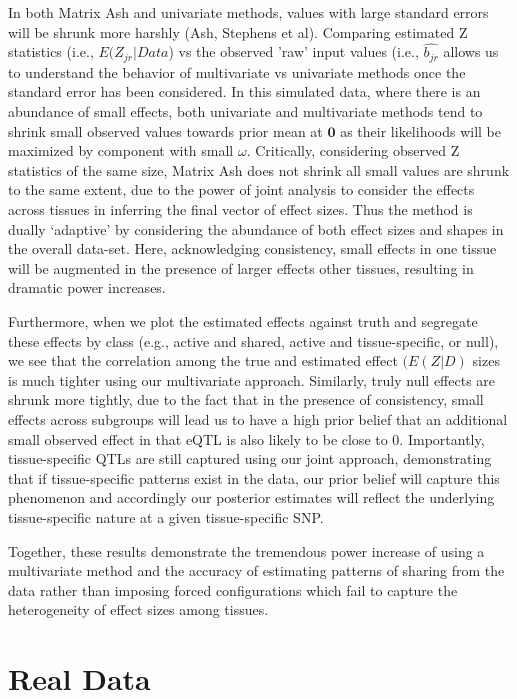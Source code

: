 {

In both Matrix Ash and univariate methods, values with large standard errors will be shrunk more harshly (Ash, Stephens et al). Comparing estimated Z statistics (i.e., $E(Z_{jr}|Data$) vs the observed 'raw' input values (i.e., $\hat{b_{jr}}$ allows us to understand the behavior of multivariate vs univariate methods once the standard error has been considered. In this simulated data, where there is an abundance of small effects, both univariate and multivariate methods tend to shrink small observed values towards prior mean at $\bm{0}$ as their likelihoods will be maximized by component with small $\omega$. Critically, considering observed Z statistics of the same size, Matrix Ash does not shrink all small values are shrunk to the same extent, due to the power of joint analysis to consider the effects across tissues in inferring the final vector of effect sizes. Thus the method is dually `adaptive' by considering the abundance of both effect sizes and shapes in the overall data-set.  Here, acknowledging consistency, small effects in one tissue will be augmented in the presence of larger effects  other tissues, resulting in dramatic power increases. 

Furthermore, when we plot the estimated effects against truth and segregate these effects by class (e.g., active and shared, active and tissue-specific, or null), we see that the correlation among the true and estimated effect $(E(Z|D)$ sizes is much tighter using our multivariate approach. Similarly, truly null effects are shrunk more tightly, due to the fact that in the presence of consistency, small effects across subgroups will lead us to have a high prior belief that an additional small observed effect in that eQTL is also likely to be close to 0. Importantly, tissue-specific QTLs are still captured using our joint approach, demonstrating that if tissue-specific patterns exist in the data, our prior belief will capture this phenomenon and accordingly our posterior estimates will reflect the underlying tissue-specific nature at a given tissue-specific SNP.

Together, these results demonstrate the tremendous power increase of using a multivariate method and the accuracy of estimating patterns of sharing from the data rather than imposing forced configurations which fail to capture the heterogeneity of effect sizes among tissues.


\section{Real Data}

}
